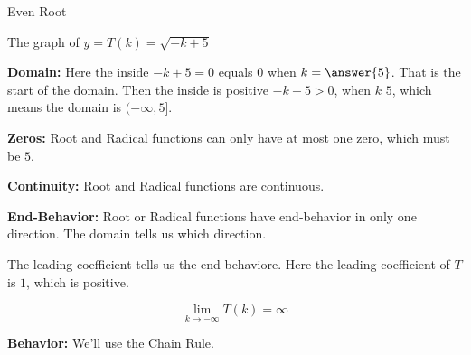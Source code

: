 \documentclass{ximera}
\begin{document}
\begin{example} Even Root

The graph of $y = T(k) = \sqrt{-k+5}$


\begin{image}
\end{image}


\textbf{Domain:} 
Here the inside $-k+5=0$ equals $0$ when $k=\answer{5}$.  That is the start of the domain.  Then the inside is positive $-k+5>0$, when $k$ \wordChoice{\choice[correct]{$<$} \choice {$>$}}  $5$, which means the domain is $(-\infty,5]$.


\textbf{Zeros:}  Root and Radical functions can only have at most one zero, which must be $5$.


\textbf{Continuity:} Root and Radical functions are continuous. 


\textbf{End-Behavior:} Root or Radical functions have end-behavior in only one direction. The domain tells us which direction.  

The leading coefficient tells us the end-behaviore. Here the leading coefficient of $T$ is $1$, which is positive.


\[  \lim\limits_{k \to -\infty} T(k) = \infty   \]







\textbf{Behavior:}  We'll use the Chain Rule.


\end{example}
\end{document}
